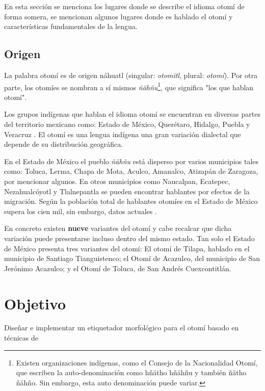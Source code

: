 \documentclass[letterpaper,12pt,oneside]{book}
\begin{document}
	
	En esta sección se menciona los lugares donde se describe el idioma otomí de forma somera, se mencionan algunos lugares donde es hablado el otomí y características fundamentales de la lengua.

	
	\subsection{Origen}

	

	La palabra otomí es de origen náhuatl (singular: \textit{otomitl}, plural: \textit{otomí}). Por otra parte, los otomíes se nombran a sí mismos \textit{ñähñu}\footnote{Existen organizaciones indígenas, como el Consejo de la Nacionalidad Otomí, que escriben la auto-denominación como hñätho hñähñu y también ñätho ñähño. Sin embargo, esta auto denominación puede variar.}, que significa "los que hablan otomí".

	
	Los grupos indígenas que hablan el idioma otomí se encuentran en diversas partes del territorio mexicano como: Estado de México, Querétaro, Hidalgo, Puebla y Veracruz \citep{barrientos2004otomies}. El otomí es una lengua indígena una gran variación dialectal que depende de su distribución geográfica.

	
	En el Estado de México el pueblo \textit{ñähñu} está disperso por varios municipios tales como: Toluca, Lerma, Chapa de Mota, Aculco, Amanalco, Atizapán de Zaragoza, por mencionar algunos. En otros municipios como Naucalpan, Ecatepec, Nezahualcóyotl y Tlalnepantla se pueden encontrar hablantes por efectos de la migración. Según \citet{barrientos2004otomies} la población total de hablantes otomíes en el Estado de México supera los cien mil, sin embargo, datos actuales .

	
	En concreto existen \textbf{nueve} variantes del otomí y cabe recalcar que dicha variación puede presentarse incluso dentro del mismo estado. Tan solo el Estado de México presenta tres variantes del otomí: El otomí de Tilapa, hablado en el municipio de Santiago Tianguistenco; el Otomí de Acazulco, del municipio de San Jerónimo Acazulco; y el Otomí de Toluca, de San Andrés Cuexcontitlán.

	
	\section{Objetivo}

	
	Diseñar e implementar un etiquetador morfológico para el otomí basado en técnicas de
\end{document}
